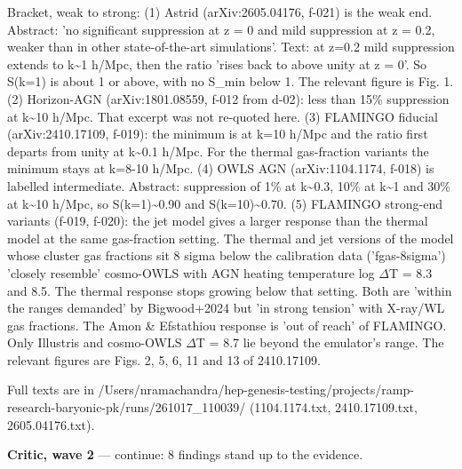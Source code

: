 \documentclass[11pt,a4paper]{article}
\begin{document}
Bracket, weak to strong: (1) Astrid (arXiv:2605.04176, f-021) is the weak end. Abstract: 'no significant suppression at z = 0 and mild suppression at z = 0.2, weaker than in other state-of-the-art simulations'. Text: at z=0.2 mild suppression extends to k\textasciitilde{}1 h/Mpc, then the ratio 'rises back to above unity at z = 0'. So S(k=1) is about 1 or above, with no S\_min below 1. The relevant figure is Fig. 1. (2) Horizon-AGN (arXiv:1801.08559, f-012 from d-02): less than 15\% suppression at k\textasciitilde{}10 h/Mpc. That excerpt was not re-quoted here. (3) FLAMINGO fiducial (arXiv:2410.17109, f-019): the minimum is at k=10 h/Mpc and the ratio first departs from unity at k\textasciitilde{}0.1 h/Mpc. For the thermal gas-fraction variants the minimum stays at k=8-10 h/Mpc. (4) OWLS AGN (arXiv:1104.1174, f-018) is labelled intermediate. Abstract: suppression of 1\% at k\textasciitilde{}0.3, 10\% at k\textasciitilde{}1 and 30\% at k\textasciitilde{}10 h/Mpc, so S(k=1)\textasciitilde{}0.90 and S(k=10)\textasciitilde{}0.70. (5) FLAMINGO strong-end variants (f-019, f-020): the jet model gives a larger response than the thermal model at the same gas-fraction setting. The thermal and jet versions of the model whose cluster gas fractions sit 8 sigma below the calibration data ('fgas-8sigma') 'closely resemble' cosmo-OWLS with AGN heating temperature log $\Delta$T = 8.3 and 8.5. The thermal response stops growing below that setting. Both are 'within the ranges demanded' by Bigwood+2024 but 'in strong tension' with X-ray/WL gas fractions. The Amon \& Efstathiou response is 'out of reach' of FLAMINGO. Only Illustris and cosmo-OWLS $\Delta$T = 8.7 lie beyond the emulator's range. The relevant figures are Figs. 2, 5, 6, 11 and 13 of 2410.17109.

Full texts are in /Users/nramachandra/hep-genesis-testing/projects/ramp-research-baryonic-pk/runs/261017\_110039/ (1104.1174.txt, 2410.17109.txt, 2605.04176.txt).

\textbf{Critic, wave 2} --- continue: 8 findings stand up to the evidence.
\end{document}
